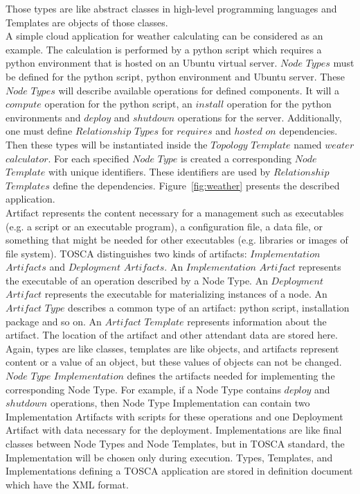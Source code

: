 Those types are like abstract classes in high-level programming languages and Templates are objects of those classes.\\
A simple cloud application for weather calculating can be considered as an example. 
The calculation is performed by a python script which requires a python environment that is hosted on an Ubuntu virtual server.
$Node$ $Types$ must be defined for the python script, python environment and Ubuntu server.  
These $Node$ $Types$ will describe available operations for defined components.
It will a $compute$ operation for the python script, an $install$ operation for the python environments and $deploy$ and $shutdown$ operations for the server.
Additionally, one must define $Relationship$ $Types$ for $requires$ and $hosted$ $on$ dependencies.
Then these types will be instantiated inside the $Topology$ $Template$ named $weater$ $calculator$.
For each specified $Node$ $Type$ is created a corresponding $Node$ $Template$ with unique identifiers.
These identifiers are used by $Relationship$ $Templates$ define the dependencies.
Figure~\ref{fig:weather} presents the described application. \\
Artifact represents the content necessary for a management such as executables (e.g. a script or an executable program), a configuration file, a data file, or something that might be needed for other executables (e.g. libraries or images of file system).
TOSCA distinguishes two kinds of artifacts: $Implementation$ $Artifacts$ and $Deployment$ $Artifacts$.
An $Implementation$ $Artifact$ represents the executable of an operation described by a Node Type.
An $Deployment$ $Artifact$ represents the executable for materializing instances of a node.
An $Artifact$ $Type$ describes a common type of an artifact: python script, installation package and so on.
An $Artifact$ $Template$ represents information about the artifact. 
The location of the artifact and other attendant data are stored here. 
Again, types are like classes, templates are like objects, and artifacts represent content or a value of an object, but these values of objects can not be changed. %
$Node$ $Type$ $Implementation$ defines the artifacts needed for implementing the corresponding Node Type.
For example, if a Node Type contains $deploy$ and $shutdown$ operations, then Node Type Implementation can contain two Implementation Artifacts with scripts for these operations and one Deployment Artifact with data necessary for the deployment. %
Implementations are like final classes between Node Types and Node Templates, but in TOSCA standard, the Implementation will be chosen only during execution.
Types, Templates, and Implementations defining a TOSCA application are stored in definition document which have the XML format. %


